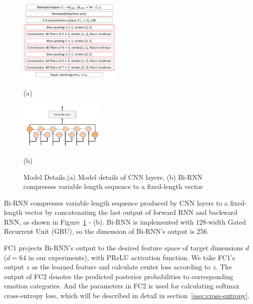 \documentclass{article}
\begin{document}
\begin{figure}[htb]
	\begin{minipage}[b]{0.04\linewidth}
		\hfill
	\end{minipage}
	\begin{minipage}[b]{0.52\linewidth}
		\centering
		\centerline{\includegraphics[width=5.0cm]{fig2.pdf}}
		\centerline{(a)}\medskip
		
	\end{minipage}
	\hfill
	\begin{minipage}[b]{.42\linewidth}
		\centering
		\centerline{\includegraphics[width=4.2cm, angle=270]{fig3.pdf}}
		\centerline{(b)  }\medskip
	\end{minipage}
	\caption{Model Details.(a) Model details of CNN layers, (b) Bi-RNN compresses variable length sequence to a fixed-length vector}
	\label{fig:model_detail}
\end{figure}

Bi-RNN compresses variable length sequence produced by CNN layers to a fixed-length vector by concatenating the last output of forward RNN and backward RNN, as shown in Figure~\ref{fig:model_detail} - (b). Bi-RNN is implemented with 128-width Gated Recurrent Unit ({GRU})\cite{Cho2014Learning}, so the dimension of Bi-RNN's output is 256.

FC1 projects Bi-RNN's output to the desired feature space of target dimensions $d$ ($d=64$ in our experiments), with PReLU\cite{He2015Delving} activation function. We take FC1's output $z$ as the learned feature and calculate center loss according to $z$. The output of FC2 denotes the predicted posterior probabilities to corresponding emotion categories. And the parameters in FC2 is used for calculating softmax cross-entropy loss, which will be described in detail in section~\ref{ssec:cross-entropy}. 
\end{document}
